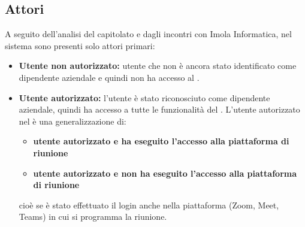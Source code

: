 \subsection{Attori}
A seguito dell'analisi del capitolato e dagli incontri con Imola Informatica, nel sistema sono 
presenti solo attori primari:
\begin{itemize}
    \item \textbf{Utente non autorizzato:} utente che non è ancora stato identificato come dipendente 
                aziendale e quindi non ha accesso al .
    \item \textbf{Utente autorizzato:} l'utente è stato riconosciuto come dipendente aziendale, quindi 
                ha accesso a tutte le funzionalità del . \newline
                L'utente autorizzato nel  è una generalizzazione di:
                \begin{itemize}
                \item \textbf{utente autorizzato e ha eseguito l'accesso alla piattaforma di riunione}
                \item \textbf{utente autorizzato e non ha eseguito l'accesso alla piattaforma di riunione}
                \end{itemize}
                cioè se è stato effettuato il login anche nella piattaforma (Zoom, Meet, Teams) in 
                cui si programma la riunione.
\end{itemize}
